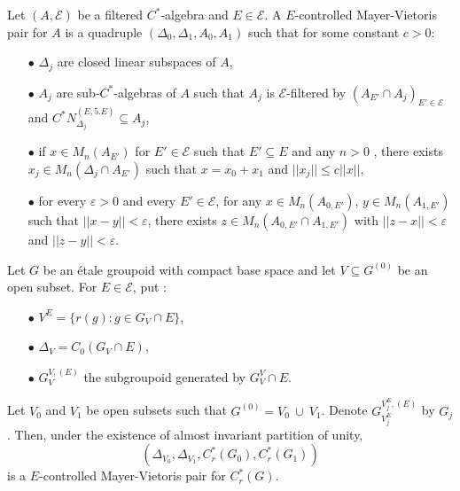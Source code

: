 \begin{definition} \label{MVpair}
Let $(A,\mathcal E)$ be a filtered $C^*$-algebra and $E \in\mathcal E$. A $E$-controlled Mayer-Vietoris pair for $A$ is a quadruple $(\Delta_0,\Delta_1,A_0,A_1)$ such that for some constant $c>0$:\\

\begin{itemize}
\item[$\bullet$] $\Delta_j$ are closed linear subspaces of $A$, 
\item[$\bullet$] $A_j$ are sub-$C^*$-algebras of $A$ such that $A_j$ is $\mathcal E$-filtered by $(A_{E'}\cap A_j)_{E'\in\mathcal E}$ and $C^* N_{\Delta_j}^{(E,5.E)}\subseteq A_j$,
\item[$\bullet$] if $x\in M_n(A_{E'})$ for $E'\in\mathcal E$ such that $E'\subseteq E$ and any $n>0$ , there exists $x_j\in M_n(\Delta_j\cap A_{E'})$ such that $x=x_0+x_1$ and $||x_j||\leq c||x||$,
\item[$\bullet$] for every $\varepsilon >0$ and every $E'\in\mathcal E$, for any $x\in M_n(A_{0,E'})$, $y\in M_n(A_{1,E'})$ such that $||x-y||<\varepsilon$,  there exists $z\in M_n(A_{0,E'}\cap A_{1,E'})$ with $||z-x||<\varepsilon$ and $||z-y||<\varepsilon$. \\
\end{itemize}
\end{definition}

\begin{Expl} Let $G$ be an étale groupoid with compact base space and let $V\subseteq G^{(0)}$ be an open subset. For $E\in\mathcal E$, put :
\begin{itemize}
\item[$\bullet$] $V^E= \{r(g) : g\in G_{V}\cap E\}$,
\item[$\bullet$] $\Delta_V = C_0(G_{V}\cap E)$,
\item[$\bullet$] $G^{V,(E)}_V$ the subgroupoid generated by $G_V^V \cap E$.
\end{itemize} 
Let $V_0$ and $V_1$ be open subsets such that $G^{(0)} = V_0\ \cup \ V_1$. Denote $G_{V_j^E}^{V_j^E , (E)}$ by $G_j$. Then, under the existence of almost invariant partition of unity, 
\[(\Delta_{V_0},\Delta_{V_1}, C_r^*(G_0),C_r^*(G_1))\] 
is a $E$-controlled Mayer-Vietoris pair for $C^*_r (G)$. 
\end{Expl}

